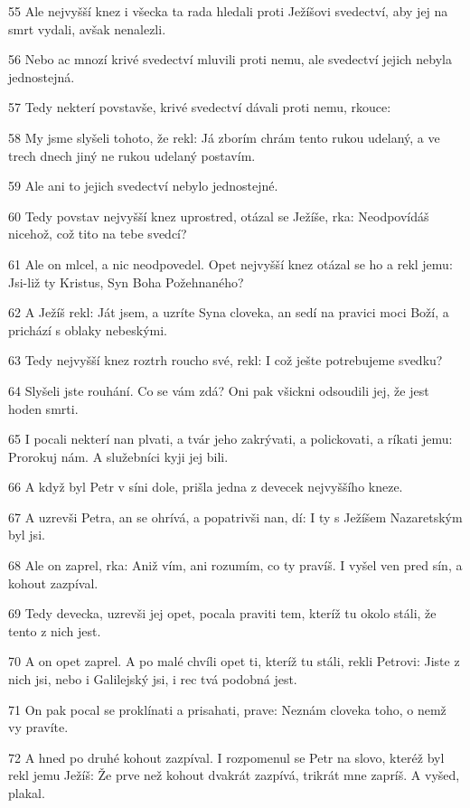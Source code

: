 \par 55 Ale nejvyšší knez i všecka ta rada hledali proti Ježíšovi svedectví, aby jej na smrt vydali, avšak nenalezli.
\par 56 Nebo ac mnozí krivé svedectví mluvili proti nemu, ale svedectví jejich nebyla jednostejná.
\par 57 Tedy nekterí povstavše, krivé svedectví dávali proti nemu, rkouce:
\par 58 My jsme slyšeli tohoto, že rekl: Já zborím chrám tento rukou udelaný, a ve trech dnech jiný ne rukou udelaný postavím.
\par 59 Ale ani to jejich svedectví nebylo jednostejné.
\par 60 Tedy povstav nejvyšší knez uprostred, otázal se Ježíše, rka: Neodpovídáš nicehož, což tito na tebe svedcí?
\par 61 Ale on mlcel, a nic neodpovedel. Opet nejvyšší knez otázal se ho a rekl jemu: Jsi-liž ty Kristus, Syn Boha Požehnaného?
\par 62 A Ježíš rekl: Ját jsem, a uzríte Syna cloveka, an sedí na pravici moci Boží, a prichází s oblaky nebeskými.
\par 63 Tedy nejvyšší knez roztrh roucho své, rekl: I což ješte potrebujeme svedku?
\par 64 Slyšeli jste rouhání. Co se vám zdá? Oni pak všickni odsoudili jej, že jest hoden smrti.
\par 65 I pocali nekterí nan plvati, a tvár jeho zakrývati, a polickovati, a ríkati jemu: Prorokuj nám. A služebníci kyji jej bili.
\par 66 A když byl Petr v síni dole, prišla jedna z devecek nejvyššího kneze.
\par 67 A uzrevši Petra, an se ohrívá, a popatrivši nan, dí: I ty s Ježíšem Nazaretským byl jsi.
\par 68 Ale on zaprel, rka: Aniž vím, ani rozumím, co ty pravíš. I vyšel ven pred sín, a kohout zazpíval.
\par 69 Tedy devecka, uzrevši jej opet, pocala praviti tem, kteríž tu okolo stáli, že tento z nich jest.
\par 70 A on opet zaprel. A po malé chvíli opet ti, kteríž tu stáli, rekli Petrovi: Jiste z nich jsi, nebo i Galilejský jsi, i rec tvá podobná jest.
\par 71 On pak pocal se proklínati a prisahati, prave: Neznám cloveka toho, o nemž vy pravíte.
\par 72 A hned po druhé kohout zazpíval. I rozpomenul se Petr na slovo, kteréž byl rekl jemu Ježíš: Že prve než kohout dvakrát zazpívá, trikrát mne zapríš. A vyšed, plakal.

